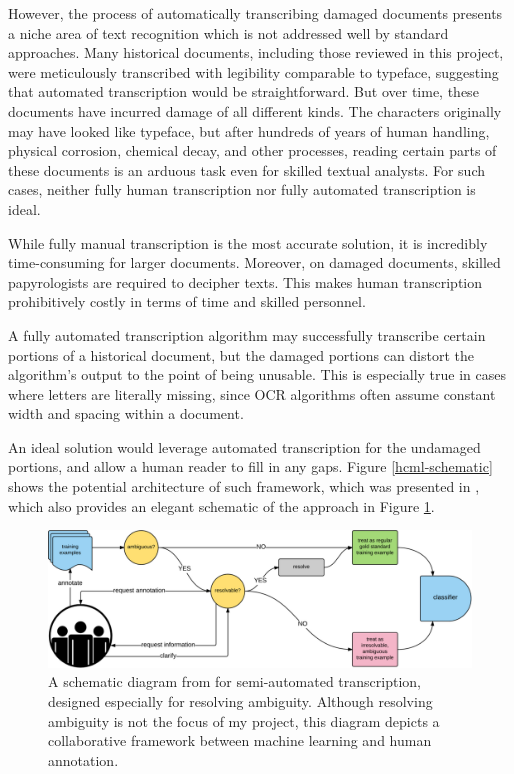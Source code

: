 \documentclass[final]{ukthesis}
\begin{document}
However, the process of automatically transcribing damaged documents presents a niche area of text recognition which is not addressed well by standard approaches. Many historical documents, including those reviewed in this project, were meticulously transcribed with legibility comparable to typeface, suggesting that automated transcription would be straightforward. But over time, these documents have incurred damage of all different kinds. The characters originally may have looked like typeface, but after hundreds of years of human handling, physical corrosion, chemical decay, and other processes, reading certain parts of these documents is an arduous task even for skilled textual analysts. For such cases, neither fully human transcription nor fully automated transcription is ideal.

While fully manual transcription is the most accurate solution, it is incredibly time-consuming for larger documents. Moreover, on damaged documents, skilled papyrologists are required to decipher texts. This makes human transcription prohibitively costly in terms of time and skilled personnel.

A fully automated transcription algorithm may successfully transcribe certain portions of a historical document, but the damaged portions can distort the algorithm's output to the point of being unusable. This is especially true in cases where letters are literally missing, since OCR algorithms often assume constant width and spacing within a document.

An ideal solution would leverage automated transcription for the undamaged portions, and allow a human reader to fill in any gaps. Figure \ref{hcml-schematic} shows the potential architecture of such framework, which was presented in \cite{schaekermann2016resolvable}, which also provides an elegant schematic of the approach in Figure \ref{fig:hcml-schematic}.


\begin{figure}[t]
\begin{center}
\includegraphics[width=14cm]{hcml-schematic}
\end{center}
\caption{A schematic diagram from \cite{schaekermann2016resolvable} for semi-automated transcription, designed especially for resolving ambiguity. Although resolving ambiguity is not the focus of my project, this diagram depicts a collaborative framework between machine learning and human annotation.}
\label{fig:hcml-schematic}
\end{figure}
\end{document}
